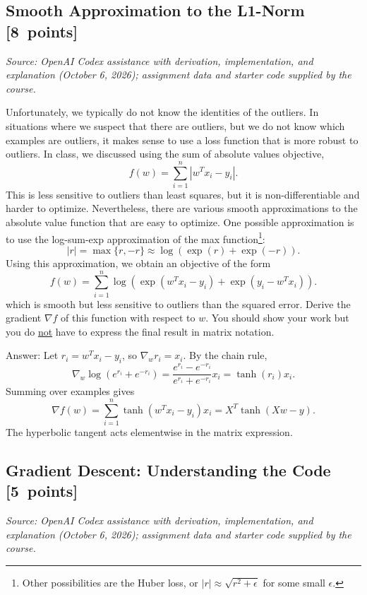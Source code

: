 \documentclass{article}
\newcommand{\blu}[1]{{\textcolor{blu}{#1}}}
\newenvironment{answer}{\par\begingroup\color{gre}Answer: }{\endgroup}
\let\ask\blu
\newcommand\pts[1]{\textcolor{pointscolour}{[#1~points]}}
\begin{document}
\subsection{Smooth Approximation to the L1-Norm \pts{8}}
\par\textit{Source: OpenAI Codex assistance with derivation, implementation, and explanation (October 6, 2026); assignment data and starter code supplied by the course.}\par


Unfortunately, we typically do not know the identities of the outliers. In situations where we suspect that there are outliers, but we do not know which examples are outliers, it makes sense to use a loss function that is more robust to outliers. In class, we discussed using the sum of absolute values objective,
\[
f(w) = \sum_{i=1}^n |w^Tx_i - y_i|.
\]
This is less sensitive to outliers than least squares, but it is non-differentiable and harder to optimize. Nevertheless, there are various smooth approximations to the absolute value function that are easy to optimize. One possible approximation is to use the log-sum-exp approximation of the max function\footnote{Other possibilities are the Huber loss, or $|r|\approx \sqrt{r^2+\epsilon}$ for some small $\epsilon$.}:
\[
|r| = \max\{r, -r\} \approx \log(\exp(r) + \exp(-r)).
\]
Using this approximation, we obtain an objective of the form
\[
f(w) {=} \sum_{i=1}^n  \log\left(\exp(w^Tx_i - y_i) + \exp(y_i - w^Tx_i)\right).
\]
which is smooth but less sensitive to outliers than the squared error. \ask{Derive
 the gradient $\nabla f$ of this function with respect to $w$. You should show your work but you do \underline{not} have to express the final result in matrix notation.}

\begin{answer}
Let $r_i=w^Tx_i-y_i$, so $\nabla_w r_i=x_i$. By the chain rule,
\[
\nabla_w\log(e^{r_i}+e^{-r_i})
=\frac{e^{r_i}-e^{-r_i}}{e^{r_i}+e^{-r_i}}x_i
=\tanh(r_i)x_i.
\]
Summing over examples gives
\[
\boxed{\nabla f(w)=\sum_{i=1}^n\tanh(w^Tx_i-y_i)x_i
=X^T\tanh(Xw-y).}
\]
The hyperbolic tangent acts elementwise in the matrix expression.
\end{answer}

\subsection{Gradient Descent: Understanding the Code \pts{5}}
\par\textit{Source: OpenAI Codex assistance with derivation, implementation, and explanation (October 6, 2026); assignment data and starter code supplied by the course.}\par
\end{document}
